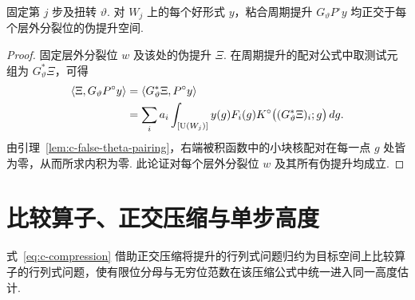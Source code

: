 \begin{lemma}[粘合周期提升与伪提升正交]
\label{lem:c-false-orthogonality}
\emitthmsource
固定第 $j$ 步及扭转 $\vartheta$. 对 $W_j$ 上的每个好形式 $y$，粘合周期提升 $G_\vartheta P^\circ y$ 均正交于每个层外分裂位的伪提升空间.
\end{lemma}

\begin{proof}
固定层外分裂位 $w$ 及该处的伪提升 $\Xi$. 在周期提升的配对公式中取测试元组为 $G_\vartheta^*\Xi$，可得
\[
 \begin{aligned}
 \langle\Xi,G_\vartheta P^\circ y\rangle
 &=\langle G_\vartheta^*\Xi,P^\circ y\rangle\\
 &=\sum_i a_i\int_{[\operatorname{U}(W_j)]}
    y(g)F_i(g)K^\circ\bigl((G_\vartheta^*\Xi)_i;g\bigr)\,dg .
 \end{aligned}
\]
由引理~\ref{lem:c-false-theta-pairing}，右端被积函数中的小块核配对在每一点 $g$ 处皆为零，从而所求内积为零. 此论证对每个层外分裂位 $w$ 及其所有伪提升均成立.
\end{proof}

\section{比较算子、正交压缩与单步高度}
\label{sec:c-compression}

式~\eqref{eq:c-compression} 借助正交压缩将提升的行列式问题归约为目标空间上比较算子的行列式问题，使有限位分母与无穷位范数在该压缩公式中统一进入同一高度估计.

